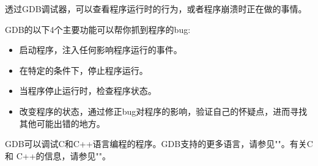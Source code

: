 透过GDB调试器，可以查看程序运行时的行为，或者程序崩溃时正在做的事情。\par
GDB的以下4个主要功能可以帮你抓到程序的bug: \par
\begin{itemize}
\item 启动程序，注入任何影响程序运行的事件。
\item 在特定的条件下，停止程序运行。
\item 当程序停止运行时，检查程序状态。
\item 改变程序的状态，通过修正bug对程序的影响，验证自己的怀疑点，进而寻找其他可能出错的地方。
\end{itemize} \par
GDB可以调试C和C++语言编程的程序。GDB支持的更多语言，请参见""。有关C 和 C++的信息，请参见""。\par
